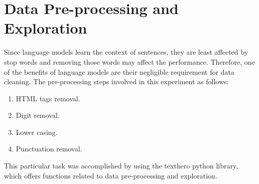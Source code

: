 \documentclass[%
	BCOR=8mm, %
	DIV=12,
	toc=bibliography, %
	toc=listof, %
	oneside, %
	egregdoesnotlikesansseriftitles, %
	]{scrbook}
\begin{document}
\section{Data Pre-processing and Exploration}
\label{section:datapreproc}
Since language models learn the context of sentences, they are least affected by stop words and removing those words may affect the performance. Therefore, one of the benefits of language models are their negligible requirement for data cleaning. The pre-processing steps involved in this experiment as follows:
\begin{enumerate}
\item  HTML tags removal.
\item Digit removal.
\item Lower casing.
\item  Punctuation removal.
\end{enumerate}
This particular task was accomplished by using the texthero python library, which offers functions related to data pre-processing and exploration.
\end{document}
